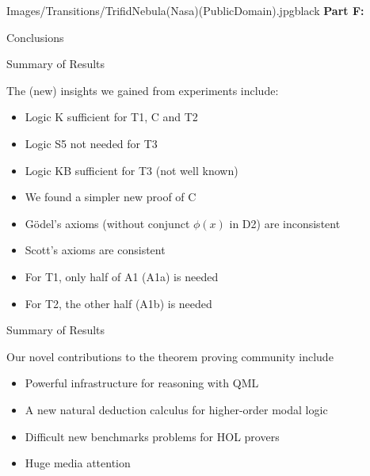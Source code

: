 
\begin{transitionframe}{Images/Transitions/TrifidNebula(Nasa)(PublicDomain).jpg}{black}
\textbf{Part F:}

Conclusions
\end{transitionframe}



\begin{frame}{Summary of Results} \large

The (\alert{new}) insights we gained from experiments include:\\[.5em]
\begin{itemize}
\item Logic K sufficient for T1, C and T2 
\item Logic S5 not needed for T3
\item \alert{Logic KB sufficient for T3 (not well known)}
\item \alert{We found a simpler new proof of C}
\item \alert{G\"odel's axioms (without conjunct $\phi(x)$ in D2) are inconsistent}
\item Scott's axioms are consistent
\item For T1, only half of A1 (A1a) is needed 
\item For T2, the other half (A1b) is needed
\end{itemize}
\end{frame}


\begin{frame}{Summary of Results} \large

Our novel contributions to the theorem proving community include \\[.5em]
\begin{itemize}
\item Powerful infrastructure for reasoning with QML
\item A new natural deduction calculus for higher-order modal logic
\item Difficult new benchmarks problems for HOL provers
\item Huge media attention
\end{itemize}
\end{frame}

